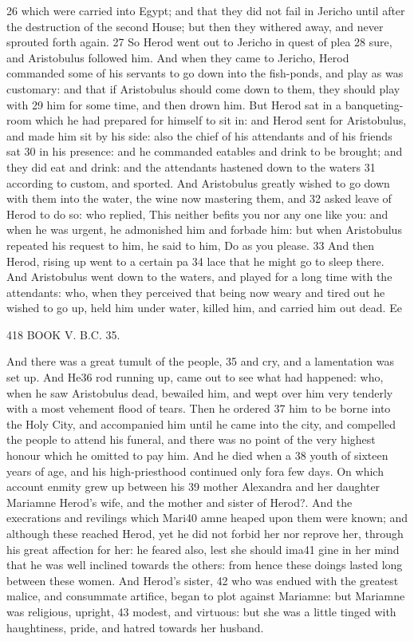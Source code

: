 26 which were carried into Egypt; and that they did not fail in Jericho until after the destruction of the second House; but then they withered away, and never sprouted forth again. 
27 So Herod went out to Jericho in quest of plea
28 sure, and Aristobulus followed him. And when they came to Jericho, Herod commanded some of his servants to go down into the fish-ponds, and 
play as was customary: and that if Aristobulus should come down to them, they should play with 
29 him for some time, and then drown him. But Herod sat in a banqueting-room which he had prepared for himself to sit in: and Herod sent for Aristobulus, and made him sit by his side: also the chief of his attendants and of his friends sat 
30 in his presence: and he commanded eatables and drink to be brought; and they did eat and drink: and the attendants hastened down to the waters 
31 according to custom, and sported. And Aristobulus greatly wished to go down with them into the water, the wine now mastering them, and 
32 asked leave of Herod to do so: who replied, This neither befits you nor any one like you: and when he was urgent, he admonished him and forbade him: but when Aristobulus repeated his request to him, he said to him, Do as you please. 
33 And then Herod, rising up went to a certain pa
34 lace that he might go to sleep there. And Aristobulus went down to the waters, and played for a long time with the attendants: who, when they perceived that being now weary and tired out he wished to go up, held him under water, killed him, and carried him out dead. 
Ee 

418 BOOK V. B.C. 35. 

And there was a great tumult of the people, 35 and cry, and a lamentation was set up. And He36 rod running up, came out to see what had happened: who, when he saw Aristobulus dead, bewailed him, and wept over him very tenderly with a most vehement flood of tears. Then he ordered 37 him to be borne into the Holy City, and accompanied him until he came into the city, and compelled the people to attend his funeral, and there was no point of the very highest honour which he omitted to pay him. And he died when a 38 youth of sixteen years of age, and his high-priesthood continued only fora few days. 
On which account enmity grew up between his 39 mother Alexandra and her daughter Mariamne Herod’s wife, and the mother and sister of Herod?. And the execrations and revilings which Mari40 amne heaped upon them were known; and although these reached Herod, yet he did not forbid her nor reprove her, through his great affection for her: he feared also, lest she should ima41 gine in her mind that he was well inclined towards the others: from hence these doings lasted long between these women. And Herod’s sister, 42 who was endued with the greatest malice, and consummate artifice, began to plot against Mariamne: but Mariamne was religious, upright, 43 modest, and virtuous: but she was a little tinged with haughtiness, pride, and hatred towards her husband. 

